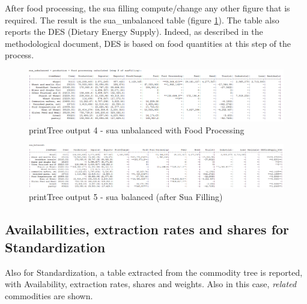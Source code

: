 \documentclass[]{article}
\begin{document}
After food processing, the sua filling compute/change any other figure
that is required. The result is the sua\_unbalanced table (figure
\ref{fig:f4}). The table also reports the DES (Dietary Energy Supply).
Indeed, as described in the methodological document, DES is based on
food quantities at this step of the process.

\newpage

\begin{landscape}
\begin{figure}[H]

{\centering \includegraphics[width=1\linewidth]{images/printTree/04_unbalanced3} 

}

\caption{\label{fig:f4}printTree output 4 - sua unbalanced with Food Processing}\label{fig:f4}
\end{figure}

\begin{figure}[H]

{\centering \includegraphics[width=1\linewidth]{images/printTree/05_balanced} 

}

\caption{\label{fig:f5}printTree output 5 - sua balanced (after Sua Filling)}\label{fig:f5}
\end{figure}
\end{landscape}

\subsection{Availabilities, extraction rates and shares for
Standardization}\label{availabilities-extraction-rates-and-shares-for-standardization}

Also for Standardization, a table extracted from the commodity tree is
reported, with Availability, extraction rates, shares and weights. Also
in this case, \emph{related} commodities are shown.
\end{document}
